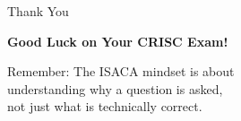 \documentclass{beamer}
\begin{document}
																													\begin{frame}{Thank You}
																														\begin{center}
																															\Huge
																															\textbf{Good Luck on Your CRISC Exam!}
																															
																															\vspace{1cm}
																															
																															\normalsize
																															Remember: The ISACA mindset is about\\
																															understanding why a question is asked,\\
																															not just what is technically correct.
																														\end{center}
																													\end{frame}
																													
																												
\end{document}
